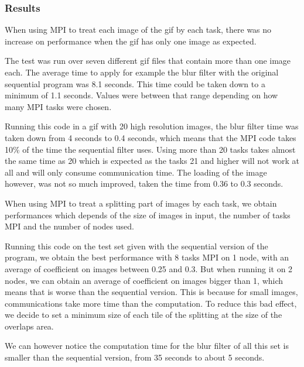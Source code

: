 \documentclass[conference,compsoc]{IEEEtran}
\begin{document}
\subsubsection{Results}
When using MPI to treat each image of the gif by each task, there was no increase on performance when the gif has only one image as expected. 

The test was run over seven different gif files that contain more than one image each. The average time to apply for example the blur filter with the original sequential program was 8.1 seconds. This time could be taken down to a minimum of 1.1 seconds. Values were between that range depending on how many MPI tasks were chosen.

Running this code in a gif with 20 high resolution images, the blur filter time was taken down from 4 seconds to 0.4 seconds, which means that the MPI code takes 10\% of the time the sequential filter uses. Using more than 20 tasks takes almost the same time as 20 which is expected as the tasks 21 and higher will not work at all and will only consume communication time.
The loading of the image however, was not so much improved, taken the time from 0.36 to 0.3 seconds.


When using MPI to treat a splitting part of images by each task, we obtain performances which depends of the size of images in input, the number of tasks MPI and the number of nodes used.

Running this code on the test set given with the sequential version of the program, we obtain the best performance with 8 tasks MPI on 1 node, with an average of coefficient on images between 0.25 and 0.3. But when running it on 2 nodes, we can obtain an average of coefficient on images bigger than 1, which means that is worse than the sequential version. This is because for small images, communications take more time than the computation. To reduce this bad effect, we decide to set a minimum size of each tile of the splitting at the size of the overlaps area.

We can however notice the computation time for the blur filter of all this set is smaller than the sequential version, from 35 seconds to about 5 seconds.
\end{document}
